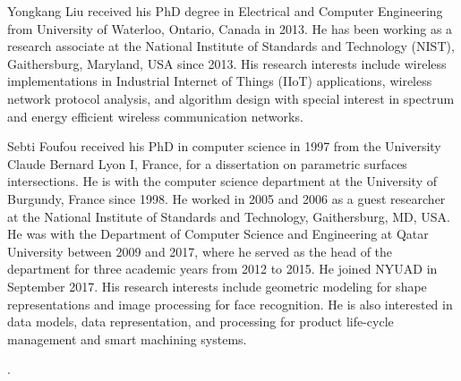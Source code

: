 \documentclass[journal, twoside]{IEEEtran}
\begin{document}
	\begin{IEEEbiography}{Yongkang Liu} received his PhD degree in Electrical and Computer Engineering from University of Waterloo, Ontario, Canada in 2013. He has been working as a research associate at the National Institute of Standards and Technology (NIST), Gaithersburg, Maryland, USA since 2013. His research interests include wireless implementations in Industrial Internet of Things (IIoT) applications, wireless network protocol analysis, and algorithm design with special interest in spectrum and energy efficient wireless communication networks.
	\end{IEEEbiography}
	\begin{IEEEbiography}
		{Sebti Foufou} received his PhD in computer science in 1997 from the University Claude Bernard Lyon I, France, for a dissertation on parametric surfaces intersections. He is with the computer science department at the University of Burgundy, France since 1998. He worked in 2005 and 2006 as a guest researcher at the National Institute of Standards and Technology, Gaithersburg, MD, USA. He was with the Department of Computer Science and Engineering at Qatar University between 2009 and 2017, where he served as the head of the department for three academic years from 2012 to 2015. He joined NYUAD in September 2017.  His research interests include geometric modeling for shape representations and image processing for face recognition. He is also interested in data models, data representation, and processing for product life-cycle management and smart machining systems.

.
	\end{IEEEbiography}    
	
	
	
	
	
\end{document}
